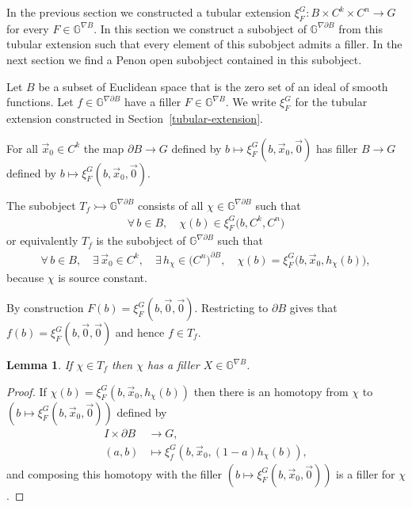 \documentclass[10pt,a4paper]{amsart}
\numberwithin{equation}{section}
\newtheorem{Lemma}[Theorem]{Lemma}
\begin{document}
In the previous section we constructed a tubular extension $\xi^G _F\colon B\times C^k\times C^n\rightarrow G$ for every $F\in \mathbb{G}^{\nabla B}$. In this section we construct a subobject of $\mathbb{G}^{\nabla \partial B}$ from this tubular extension such that every element of this subobject admits a f\/iller. In the next section we f\/ind a Penon open subobject contained in this subobject.

\begin{Notation} Let $B$ be a subset of Euclidean space that is the zero set of an ideal of smooth functions. Let $f\in \mathbb{G}^{\nabla\partial B}$ have a f\/iller $F\in \mathbb{G}^{\nabla B}$. We write $\xi^G_F$ for the tubular extension constructed in Section~\ref{tubular-extension}.
\end{Notation}

\begin{Remark} For all $\vec{x}_0\in C^k$ the map $\partial B\rightarrow G$ def\/ined by $b\mapsto \xi^G_F(b,\vec{x}_0,\vec{0})$ has f\/iller $B\rightarrow G$ def\/ined by $b\mapsto \xi^G_F(b,\vec{x}_0,\vec{0})$.
\end{Remark}

\begin{Definition} The subobject $T_f \rightarrowtail \mathbb{G}^{\nabla\partial B}$ consists of all $\chi\in \mathbb{G}^{\nabla\partial B}$ such that
\begin{gather*}\forall\, b\in B, \quad \chi(b)\in \xi^G_F\big(b,C^k,C^n\big)\end{gather*}
or equivalently $T_f$ is the subobject of $\mathbb{G}^{\nabla\partial B}$ such that
\begin{gather*}\forall\, b \in B, \quad \exists\, \vec{x}_0\in C^k, \quad \exists\, h_{\chi}\in \big(C^n\big)^{\partial B}, \quad \chi(b)=\xi^G_F\big(b,\vec{x}_0,h_{\chi}(b)\big),\end{gather*}
because $\chi$ is source constant.
\end{Definition}

\begin{Remark}By construction $F(b)=\xi^G_F(b,\vec{0},\vec{0})$. Restricting to $\partial B$ gives that $f(b)=\xi^G_F(b,\vec{0},\vec{0})$ and hence $f\in T_f$.
\end{Remark}

\begin{Lemma}If $\chi\in T_f$ then $\chi$ has a filler $X\in \mathbb{G}^{\nabla B}$.
\end{Lemma}
\begin{proof}If $\chi(b)=\xi^G_F(b,\vec{x}_0,h_{\chi}(b))$ then there is an homotopy from $\chi$ to $(b\mapsto \xi^G_F(b,\vec{x}_0,\vec{0}))$ def\/ined by
\begin{align*}
I\times \partial B &\rightarrow G,\\
(a,b) &\mapsto \xi^G_f\left(b,\vec{x}_0,(1-a)h_{\chi}(b)\right),
\end{align*}
and composing this homotopy with the f\/iller $(b\mapsto \xi^G_F(b,\vec{x}_0,\vec{0}))$ is a f\/iller for $\chi$.
\end{proof}
\end{document}
